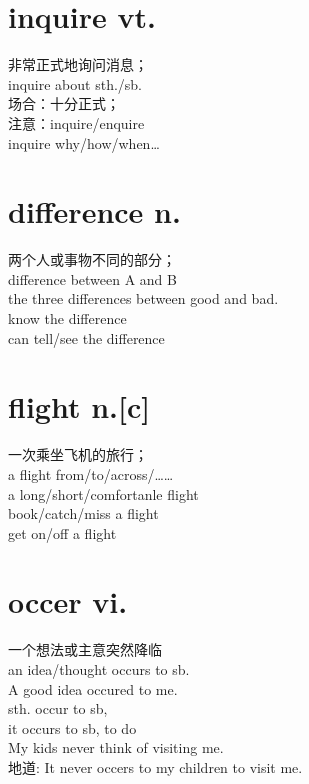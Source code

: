 \documentclass[twocolumn]{ctexbook}
\newcommand{\point}[1]{{\color{red}#1}}
\newcommand{\sentence}[1]{{\colorbox[gray]{0.8}{#1}}}
\begin{document}
        \section{inquire vt.}
        非常正式地询问消息；\\
        \sentence{inquire about sth./sb.}\\
        场合：十分正式；\\
        注意：inquire/enquire\\
        inquire why/how/when\ldots\\
        \section{difference n.}
        两个人或事物不同的部分；\\
        difference between A and B\\
        the  three  difference\point{s} between good and bad.\\
        know the difference\\
        can tell/see the difference \\
        \section{flight n.[c]}
        一次乘坐飞机的旅行；\\
        a flight from/to/across/……\\
        a long/short/comfortanle flight\\
        book/catch/miss a flight\\
        get on/off a flight\\
        \section{occer vi.}
        一个想法或主意突然降临\\
        an idea/thought occurs to sb.\\
        A good idea occured to me.\\
        sth. occur to sb,\\
        it occurs to sb, to do \\
        \sentence{My kids never think of visiting me.}\\
        地道: It never occers to my children to visit me.\\
      
\end{document}
